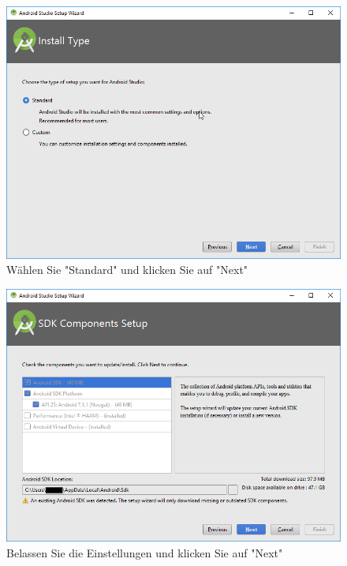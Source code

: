 \documentclass[a4paper,10pt,xetex]{article}
\begin{document}
\begin{figure}
  \centering
  \includegraphics[width=\textwidth]{Installation/1-11}
  \caption{Wählen Sie "Standard" und klicken Sie auf "Next"}
\end{figure}

\begin{figure}
  \centering
  \includegraphics[width=\textwidth]{Installation/1-12}
  \caption{Belassen Sie die Einstellungen und klicken Sie auf "Next"}
\end{figure}
\end{document}
